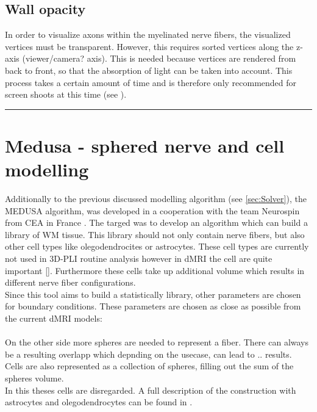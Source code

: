 \subsection{Wall opacity}
% 
In order to visualize axons within the myelinated nerve fibers, the visualized vertices must be transparent.
However, this requires sorted vertices along the z-axis (viewer/camera? axis).
This is needed because vertices are rendered from back to front, so that the absorption of light can be taken into account.
This process takes a certain amount of time and is therefore only recommended for screen shoots at this time (see \dummy{}).
% 
% 
\vspace{5pt}
\hrule
\vspace{6pt}
% 
\newpage
% 
\section{Medusa - sphered nerve and cell modelling}
% 
% 
Additionally to the previous discussed modelling algorithm (see \cref{sec:Solver}), the \ac{MEDUSA} algorithm, was developed in a cooperation with the team Neurospin from \ac{CEA} in France \cite{Ginsburger2019}. The targed was to develop an algorithm which can build a library of \ac{WM} tissue. This library should not only contain nerve fibers, but also other cell types like olegodendrocites or astrocytes. These cell types are currently not used in \ac{3D-PLI} routine analysis however in \ac{dMRI} the cell are quite important [\dummy{}]. Furthermore these cells take up additional volume which results in different nerve fiber configurations.\\
% 
Since this tool aims to build a statistically library, other parameters are chosen for boundary conditions. These parameters are chosen as close as possible from the current \ac{dMRI} models:
\dummy{}\\
\dummy{}\\
% 
% 
On the other side more spheres are needed to represent a fiber. There can always be a resulting overlapp which depnding on the usecase, can lead to .. results.\\
% 
Cells are also represented as a collection of spheres, filling out the sum of the spheres volume. \\
%
In this theses cells are disregarded. A full description of the construction with astrocytes and olegodendrocytes can be found in \cite{Ginsburger2019}.
% 
